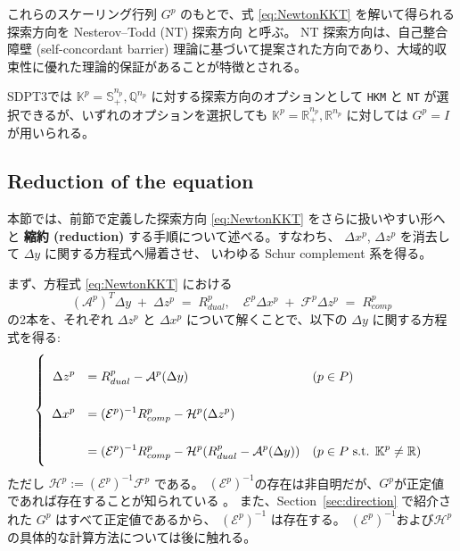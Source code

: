\documentclass{jsarticle}
\begin{document}
\medskip

これらのスケーリング行列 $G^p$ のもとで、式 \eqref{eq:NewtonKKT} を解いて得られる探索方向を Nesterov--Todd (NT) 探索方向 \cite{Nesterov1997,todd1998} と呼ぶ。
NT 探索方向は、自己整合障壁 (self-concordant barrier) 理論に基づいて提案された方向であり、大域的収束性に優れた理論的保証があることが特徴とされる。

\medskip

SDPT3では $\mathbb{K}^p = \mathbb{S}^{n_p}_+, \mathbb{Q}^{n_p}$ に対する探索方向のオプションとして \texttt{HKM} と \texttt{NT} が選択できるが、いずれのオプションを選択しても $\mathbb{K}^p = \mathbb{R}^{n_p}_+, \mathbb{R}^{n_p}$ に対しては $G^p=I$ が用いられる。

\medskip

\subsection{Reduction of the equation}
本節では、前節で定義した探索方向 \eqref{eq:NewtonKKT} をさらに扱いやすい形へと
\textbf{縮約 (reduction)} する手順について述べる。すなわち、
$\Delta x^p$, $\Delta z^p$ を消去して $\Delta y$ に関する方程式へ帰着させ、
いわゆる Schur complement 系を得る。

まず、方程式 \eqref{eq:NewtonKKT} における
\[
  (\mathcal{A}^p)^T \Delta y \;+\; \Delta z^p
    \;=\; R_{dual}^p,
  \quad
  \mathcal{E}^p \Delta x^p \;+\; \mathcal{F}^p \Delta z^p
    \;=\; R_{comp}^p
\]
の2本を、それぞれ $\Delta z^p$ と $\Delta x^p$ について解くことで、以下の $\Delta y$ に関する方程式を得る:
\begin{equation}
    \everymath{\displaystyle}
    \renewcommand{\arraystretch}{2.5}
    \left\{
    \begin{array}{rll}
    \Delta z^p &= R_{dual}^p - \mathcal{A}^p(\Delta y)  & (p\in P)\\
    \Delta x^p &= (\mathcal{E}^p)^{-1}R_{comp}^p - \mathcal{H}^p(\Delta z^p) \\
               &= (\mathcal{E}^p)^{-1}R_{comp}^p - \mathcal{H}^p(R_{dual}^p - \mathcal{A}^p(\Delta y))  & (p\in P \text{ s.t. } \mathbb{K}^p \neq \mathbb{R})
   \end{array}
   \right.
   \label{eq:sol_x_z}
\end{equation}
ただし $\mathcal{H}^p:=(\mathcal{E}^p)^{-1}\mathcal{F}^p$ である。
$(\mathcal{E}^p)^{-1}$の存在は非自明だが、$G^p$が正定値であれば存在することが知られている \cite{todd1998}。
また、Section~\ref{sec:direction} で紹介された $G^p$ はすべて正定値であるから、 $(\mathcal{E}^p)^{-1}$ は存在する。
$(\mathcal{E}^p)^{-1}$および$\mathcal{H}^p$の具体的な計算方法については後に触れる。
\end{document}
